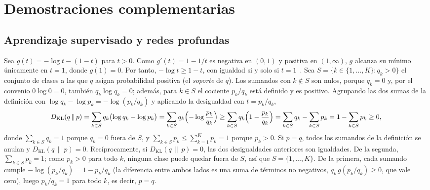 %

\chapter{Demostraciones complementarias}\label{ap:demostraciones}

\section{Aprendizaje supervisado y redes profundas}\label{sec:dem-aprendizaje}

\begin{demostracion}
Sea $g(t) = -\log t - (1 - t)$ para $t > 0$. Como $g'(t) = 1 - 1/t$ es negativa en
$(0,1)$ y positiva en $(1,\infty)$, $g$ alcanza su mínimo únicamente en $t = 1$,
donde $g(1) = 0$. Por tanto, $-\log t \ge 1 - t$, con igualdad si y solo si
$t = 1$~\cite[ap.~C.5.1]{prince2023understanding}. Sea
$S = \{k\in\{1,\dots,K\} : q_k > 0\}$ el conjunto de clases a las que $q$ asigna
probabilidad positiva (el \emph{soporte} de $q$). Los sumandos con $k\notin S$
son nulos, porque $q_k = 0$ y, por el convenio $0\log 0 = 0$, también
$q_k\log q_k = 0$; además, para $k\in S$ el cociente $p_k/q_k$ está definido y es
positivo. Agrupando las dos sumas de la definición con
$\log q_k - \log p_k = -\log(p_k/q_k)$ y aplicando la desigualdad con
$t = p_k/q_k$,
\[
  D_{\mathrm{KL}}(q\,\|\,p) = \sum_{k\in S} q_k\bigl(\log q_k - \log p_k\bigr)
  = \sum_{k\in S} q_k\Bigl(-\log\frac{p_k}{q_k}\Bigr)
  \ge \sum_{k\in S} q_k\Bigl(1 - \frac{p_k}{q_k}\Bigr)
  = \sum_{k\in S} q_k - \sum_{k\in S} p_k
  = 1 - \sum_{k\in S} p_k \ge 0,
\]
donde $\sum_{k\in S} q_k = 1$ porque $q_k = 0$ fuera de $S$, y
$\sum_{k\in S} p_k \le \sum_{k=1}^{K} p_k = 1$ porque $p_k > 0$.
Si $p = q$, todos los sumandos de la definición se anulan y
$D_{\mathrm{KL}}(q\,\|\,p) = 0$. Recíprocamente, si $D_{\mathrm{KL}}(q\,\|\,p) = 0$,
las dos desigualdades anteriores son igualdades. De la segunda,
$\sum_{k\in S} p_k = 1$; como $p_k > 0$ para todo $k$, ninguna clase puede quedar
fuera de $S$, así que $S = \{1,\dots,K\}$. De la primera, cada sumando cumple
$-\log(p_k/q_k) = 1 - p_k/q_k$ (la diferencia entre ambos lados es una suma de
términos no negativos, $q_k\,g(p_k/q_k)\ge 0$, que vale cero), luego $p_k/q_k = 1$
para todo $k$, es decir, $p = q$.
\end{demostracion}

